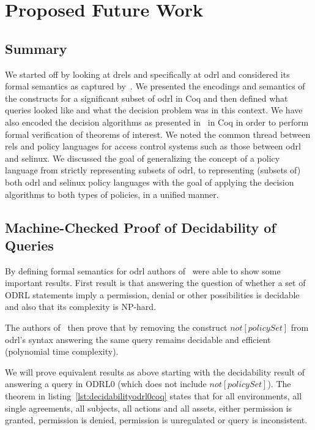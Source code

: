 \chapter{Proposed Future Work}

\section{Summary}

We started off by looking at \ac{drel}s and specifically at \ac{odrl} and considered its formal semantics as captured by~\cite{pucella2006}. We presented the encodings and semantics of the constructs for a significant subset of \ac{odrl} in Coq and then defined what queries looked like and what the decision problem was in this context. We have also encoded the decision algorithms as presented in~\cite{pucella2006} in Coq in order to perform formal verification of theorems of interest. We noted the common thread between \ac{rel}s and policy languages for access control systems such as those between \ac{odrl} and \ac{selinux}. We discussed the goal of generalizing the concept of a policy language from strictly representing subsets of \ac{odrl}, to representing (subsets of) both \ac{odrl} and \ac{selinux} policy languages with the goal of applying the decision algorithms to both types of policies, in a unified manner.


\section{Machine-Checked Proof of Decidability of Queries}

By defining formal semantics for \ac{odrl} authors of~\cite{pucella2006} were able to show some important results. First result is that answering the question of whether a set of ODRL statements imply a permission, denial or other possibilities is decidable and also that its complexity is NP-hard.

The authors of~\cite{pucella2006} then prove that by removing the construct $not[policySet]$ from \ac{odrl}'s syntax answering the same query remains decidable and efficient (polynomial time complexity). 

We will prove equivalent results as above starting with the decidability result of answering a query in ODRL0 (which does not include $not[policySet]$). The theorem in listing~\ref{lst:decidabilityodrl0coq} states that for all environments, all single agreements, all subjects, all actions and all assets, either permission is granted, permission is denied, permission is unregulated or query is inconsistent. 


